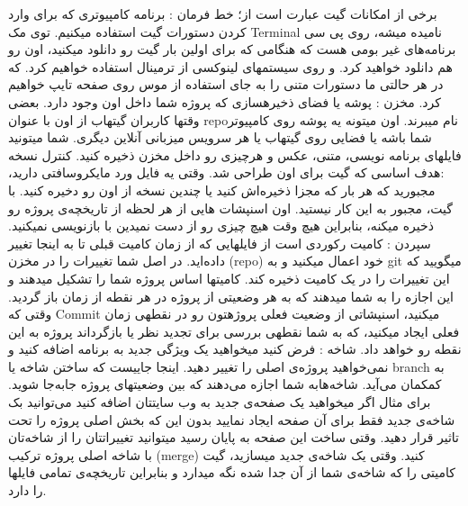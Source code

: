 برخی از امکانات گیت عبارت است از؛ \newline
خط فرمان : برنامه کامپیوتری که برای وارد کردن دستورات گیت استفاده میکنیم. توی مک Terminal نامیده میشه، روی پی سی برنامه‌های غیر بومی هست که هنگامی که برای اولین بار گیت رو دانلود میکنید، اون رو هم دانلود خواهید کرد. و روی سیستمهای لینوکسی از ترمینال استفاده خواهیم کرد. که در هر حالتی ما دستورات متنی را به جای استفاده از موس روی صفحه تایپ خواهیم
کرد. \newline
مخزن : پوشه یا فضای ذخیرهسازی که پروژه شما داخل اون وجود دارد. بعضی وقتها کاربران گیتهاب از اون با عنوان repoنام میبرند. اون میتونه یه پوشه روی کامپیوتر شما باشه یا فضایی روی گیتهاب یا هر سرویس میزبانی آنلاین دیگری. شما میتونید فایلهای برنامه نویسی، متنی، عکس و هرچیزی رو داخل مخزن ذخیره کنید. \newline
کنترل نسخه :هدف اساسی که گیت برای اون طراحی شد. وقتی یه فایل ورد مایکروسافتی دارید، مجبورید که هر بار که مجزا ذخیره‌اش کنید یا چندین نسخه از اون رو دخیره کنید. با گیت، مجبور به این کار نیستید. اون اسنپشات هایی از هر لحظه از تاریخچه‌ی پروژه رو ذخیره میکنه، بنابراین هیچ وقت هیچ چیزی رو از دست نمیدین با بازنویسی نمیکنید. \newline
سپردن : کامیت رکوردی است از فایلهایی که از زمان کامیت قبلی تا به اینجا تغییر داده‌اید. در اصل شما تغییرات را در مخزن (repo) خود اعمال میکنید و به git میگویید که این تغییرات را در یک کامیت ذخیره کند. کامیتها اساس پروژه شما را تشکیل میدهند و این اجازه را به شما میدهند که به هر وضعیتی از پروژه در هر نقطه از زمان باز گردید. وقتی که Commit میکنید، اسنپشاتی از وضعیت فعلی پروژهتون رو در نقطهی زمان فعلی ایجاد میکنید، که به شما نقطهی بررسی برای تجدید نظر یا بازگرداند پروژه به این نقطه رو خواهد داد. \newline
شاخه : فرض کنید میخواهید یک ویژگی جدید به برنامه اضافه کنید و نمی‌خواهید پروژه‌ی اصلی را تغییر دهید. اینجا جاییست که ساختن شاخه یا branch به کمکمان می‌آید. شاخه‌هابه شما اجازه می‌دهند که بین وضعیتهای پروژه جا‌به‌جا شوید. برای مثال اگر میخواهید یک صفحه‌ی جدید به وب سایتتان اضافه کنید می‌توانید بک شاخه‌ی جدید فقط برای آن صفحه ایجاد نمایید بدون این که بخش اصلی پروژه را تحت تاثیر قرار دهید. وقتی ساخت این صفحه به پایان رسید میتوانید تغییراتتان را از شاخه‌تان با شاخه اصلی پروژه ترکیب (merge) کنید. وقتی یک شاخه‌ی جدید میسازید، گیت کامیتی را که شاخه‌ی شما از آن جدا شده نگه میدارد و بنابراین تاریخچه‌ی تمامی
فایلها را دارد.